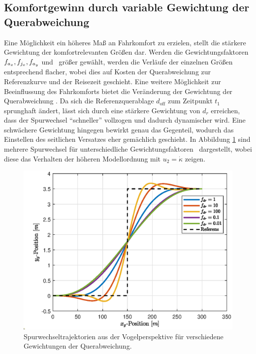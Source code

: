 \subsection{Komfortgewinn durch variable Gewichtung der Querabweichung}
Eine Möglichkeit ein höheres Maß an Fahrkomfort zu erzielen, stellt die stärkere Gewichtung der komfortrelevanten Größen dar. Werden die Gewichtungsfaktoren $f_{a_x}, f_{j_x}, f_{a_y}$ und \fjy~größer gewählt, werden die Verläufe der einzelnen Größen entsprechend flacher, wobei dies auf Kosten der Querabweichung zur Referenzkurve und der Reisezeit geschieht. Eine weitere Möglichkeit zur Beeinflussung des Fahrkomforts bietet die Veränderung der Gewichtung der Querabweichung \fdr. Da sich die Referenzquerablage $d_{\textrm{off}}$ zum Zeitpunkt $t_1$ sprunghaft ändert, lässt sich durch eine stärkere Gewichtung von $d_r$ erreichen, dass der Spurwechsel ``schneller'' vollzogen und dadurch dynamischer wird. Eine schwächere Gewichtung hingegen bewirkt genau das Gegenteil, wodurch das Einstellen des seitlichen Versatzes eher gemächlich geschieht. In Abbildung \ref{fig:xy_pos_fdr_var} sind mehrere Spurwechsel für unterschiedliche Gewichtungsfaktoren \fdr~dargestellt, wobei diese das Verhalten der höheren Modellordnung mit $u_2 = \dot{\kappa}$ zeigen. 
\begin{figure}[h] 
	\centering
	\includegraphics[width=0.7\linewidth]{./Bilder/Ergebnisse/Geradeausfahrt/Spurwechsel/fdr_var/xy_pos.eps}
	\caption{Spurwechseltrajektorien aus der Vogelperspektive für verschiedene Gewichtungen der Querabweichung.}
	\label{fig:xy_pos_fdr_var}
\end{figure} 
